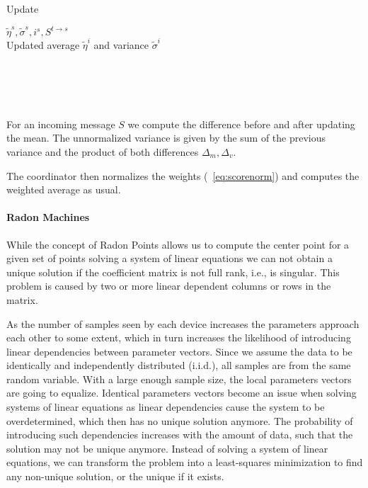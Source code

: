 \begin{algo}{Update}
    \begin{algorithm}[H]
        \begin{algorithmic}[1]
    \REQUIRE $\tilde{\eta}^s, \tilde{\sigma}^s, i^s, S^{t \rightarrow s}$ \\
    \ENSURE  Updated average $\tilde{\eta}^i$ and variance $\tilde{\sigma}^i$ \\
    \\
    \\
    \\
    \\
\end{algorithmic}
\caption[Update procedure for the online mean and variance computation]{For an incoming message $S$ we compute the difference before and after updating the mean. The unnormalized variance is given by the sum of the previous variance and the product of both differences $\Delta_m, \Delta_v$.}
\label{alg:updWelford}
\end{algorithm}
\end{algo}

The coordinator then normalizes the weights (\eq~\ref{eq:scorenorm}) and computes the weighted average as usual.

\paragraph*{Radon Machines}
While the concept of Radon Points allows us to compute the center point for a given set of points solving a system of linear equations we can not obtain a unique solution if the coefficient matrix is not full rank, i.e., is singular.
This problem  is caused by two or more linear dependent columns or rows in the matrix.

As the number of samples seen by each device increases the parameters approach each other to some extent, which in turn increases the likelihood of introducing linear dependencies between parameter vectors.
Since we assume the data to be identically and independently distributed (i.i.d.), all samples are from the same random variable. 
With a large enough sample size, the local parameters vectors are going to equalize.
Identical parameters vectors become an issue when solving systems of linear equations as linear dependencies cause the system to be overdetermined, which then has no unique solution anymore.
The probability of introducing such dependencies increases with the amount of data, such that the solution may not be unique anymore.
Instead of solving a system of linear equations, we can transform the problem into a least-squares minimization to find any non-unique solution, or the unique if it exists.

